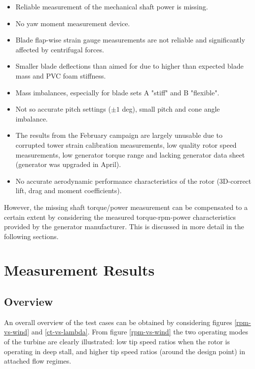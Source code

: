 \documentclass[a4paper]{jpconf}
\begin{document}
\begin{itemize}
	\item Reliable measurement of the mechanical shaft power is missing.
	\item No yaw moment measurement device.
	\item Blade flap-wise strain gauge measurements are not reliable and significantly affected by centrifugal forces.
	\item Smaller blade deflections than aimed for due to higher than expected blade mass and PVC foam stiffness.
	\item Mass imbalances, especially for blade sets A "stiff" and B "flexible".
	\item Not so accurate pitch settings ($\pm 1$ deg), small pitch and cone angle imbalance.
	\item The results from the February campaign are largely unusable due to corrupted tower strain calibration measurements, low quality rotor speed measurements, low generator torque range and lacking generator data sheet (generator was upgraded in April).
	\item No accurate aerodynamic performance characteristics of the rotor (3D-correct lift, drag and moment coefficients).
\end{itemize}

However, the missing shaft torque/power measurement can be compensated to a certain extent by considering the measured torque-rpm-power characteristics provided by the generator manufacturer. This is discussed in more detail in the following sections.


\section{Measurement Results}

\subsection{Overview}

An overall overview of the test cases can be obtained by considering figures \ref{rpm-vs-wind} and \ref{ct-vs-lambda}. From figure \ref{rpm-vs-wind} the two operating modes of the turbine are clearly illustrated: low tip speed ratios when the rotor is operating in deep stall, and higher tip speed ratios (around the design point) in attached flow regimes. 
\end{document}

